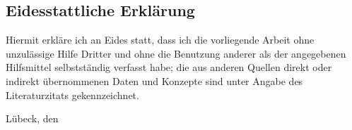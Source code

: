 \subsection*{Eidesstattliche Erklärung}
Hiermit erkläre ich an Eides statt, dass ich die vorliegende Arbeit ohne unzulässige Hilfe Dritter und ohne die Benutzung anderer als der angegebenen Hilfsmittel selbst\-ständig verfasst habe; die aus anderen Quellen direkt oder indirekt übernommenen Daten und Konzepte sind unter Angabe des Literaturzitats gekennzeichnet.

\vspace{2cm}

Lübeck, den \submitdate


